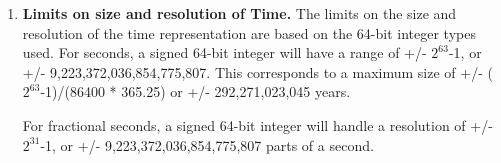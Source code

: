 
\begin{enumerate}

\item {\bf Limits on size and resolution of Time.}  The limits on the size and 
resolution of the time representation are based on the
64-bit integer types used.  For seconds, a signed 64-bit integer
will have a range of +/- $2^{63}$-1, or +/- 9,223,372,036,854,775,807.  This
corresponds to a maximum size of +/- ($2^{63}$-1)/(86400 * 365.25) or
+/- 292,271,023,045 years.

\begin{sloppypar}
For fractional seconds, a signed 64-bit integer will handle a resolution of
+/- $2^{31}$-1, or +/- 9,223,372,036,854,775,807 parts of a second.
\end{sloppypar}

\end{enumerate}
